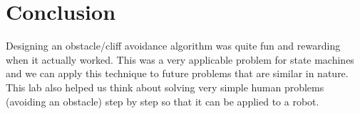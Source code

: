 \documentclass[10pt,titlepage]{article}
\begin{document}
  \section{Conclusion}
    Designing an obstacle/cliff avoidance algorithm was quite fun and rewarding when it actually worked. This was a very applicable problem for state machines and we can apply this technique to future problems that are similar in nature. This lab also helped us think about solving very simple human problems (avoiding an obstacle) step by step so that it can be applied to a robot.
\end{document}
